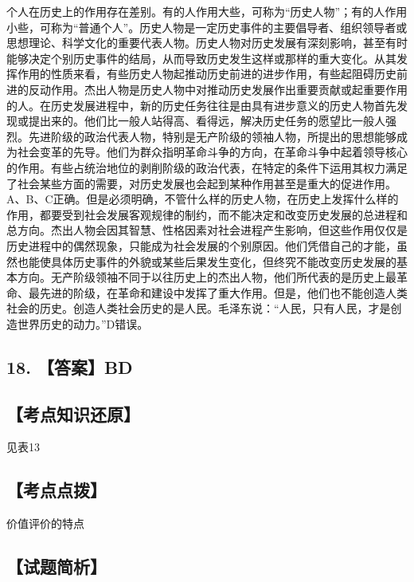 \documentclass[UTF8,11pt]{ctexart}
\begin{document}
个人在历史上的作用存在差别。有的人作用大些，可称为“历史人物”；有的人作用小些，可称为“普通个人”。历史人物是一定历史事件的主要倡导者、组织领导者或思想理论、科学文化的重要代表人物。历史人物对历史发展有深刻影响，甚至有时能够决定个别历史事件的结局，从而导致历史发生这样或那样的重大变化。从其发挥作用的性质来看，有些历史人物起推动历史前进的进步作用，有些起阻碍历史前进的反动作用。杰出人物是历史人物中对推动历史发展作出重要贡献或起重要作用的人。在历史发展进程中，新的历史任务往往是由具有进步意义的历史人物首先发现或提出来的。他们比一般人站得高、看得远，解决历史任务的愿望比一般人强烈。先进阶级的政治代表人物，特别是无产阶级的领袖人物，所提出的思想能够成为社会变革的先导。他们为群众指明革命斗争的方向，在革命斗争中起着领导核心的作用。有些占统治地位的剥削阶级的政治代表，在特定的条件下运用其权力满足了社会某些方面的需要，对历史发展也会起到某种作用甚至是重大的促进作用。A、B、C正确。但是必须明确，不管什么样的历史人物，在历史上发挥什么样的作用，都要受到社会发展客观规律的制约，而不能决定和改变历史发展的总进程和总方向。杰出人物会因其智慧、性格因素对社会进程产生影响，但这些作用仅仅是历史进程中的偶然现象，只能成为社会发展的个别原因。他们凭借自己的才能，虽然也能使具体历史事件的外貌或某些后果发生变化，但终究不能改变历史发展的基本方向。无产阶级领袖不同于以往历史上的杰出人物，他们所代表的是历史上最革命、最先进的阶级，在革命和建设中发挥了重大作用。但是，他们也不能创造人类社会的历史。创造人类社会历史的是人民。毛泽东说：“人民，只有人民，才是创造世界历史的动力。”D错误。


\subsection*{18. 【答案】BD}

\subsection*{【考点知识还原】}

见表13


\subsection*{【考点点拨】}

价值评价的特点


\subsection*{【试题简析】}
\end{document}
